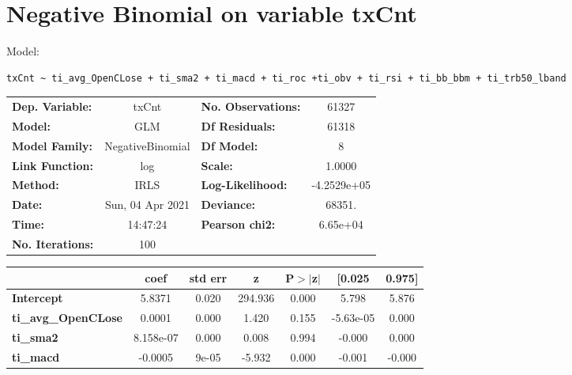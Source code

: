 \section{Negative Binomial on variable txCnt}

Model: \begin{verbatim}txCnt ~ ti_avg_OpenCLose + ti_sma2 + ti_macd + ti_roc +ti_obv + ti_rsi + ti_bb_bbm + ti_trb50_lband\end{verbatim}

\begin{center}
\begin{tabular}{lclc}
\toprule
\textbf{Dep. Variable:}     &      txCnt       & \textbf{  No. Observations:  } &     61327    \\
\textbf{Model:}             &       GLM        & \textbf{  Df Residuals:      } &     61318    \\
\textbf{Model Family:}      & NegativeBinomial & \textbf{  Df Model:          } &         8    \\
\textbf{Link Function:}     &       log        & \textbf{  Scale:             } &     1.0000   \\
\textbf{Method:}            &       IRLS       & \textbf{  Log-Likelihood:    } & -4.2529e+05  \\
\textbf{Date:}              & Sun, 04 Apr 2021 & \textbf{  Deviance:          } &     68351.   \\
\textbf{Time:}              &     14:47:24     & \textbf{  Pearson chi2:      } &   6.65e+04   \\
\textbf{No. Iterations:}    &       100        & \textbf{                     } &              \\
\bottomrule
\end{tabular}
\begin{tabular}{lcccccc}
                            & \textbf{coef} & \textbf{std err} & \textbf{z} & \textbf{P$> |$z$|$} & \textbf{[0.025} & \textbf{0.975]}  \\
\midrule
\textbf{Intercept}          &       5.8371  &        0.020     &   294.936  &         0.000        &        5.798    &        5.876     \\
\textbf{ti\_avg\_OpenCLose} &       0.0001  &        0.000     &     1.420  &         0.155        &    -5.63e-05    &        0.000     \\
\textbf{ti\_sma2}           &    8.158e-07  &        0.000     &     0.008  &         0.994        &       -0.000    &        0.000     \\
\textbf{ti\_macd}           &      -0.0005  &        9e-05     &    -5.932  &         0.000        &       -0.001    &       -0.000     \\

\end{tabular}
\end{center}

